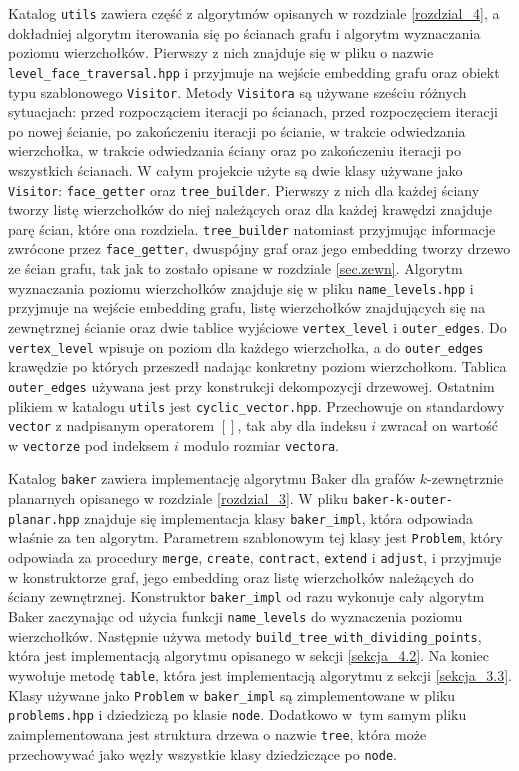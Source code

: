 \documentclass[twoside,a4paper,12pt]{report} %
\theoremstyle{break}
\begin{document}
Katalog \texttt{utils} zawiera część z algorytmów opisanych w rozdziale \ref{rozdzial_4},  a dokładniej algorytm iterowania się po ścianach grafu i algorytm wyznaczania poziomu wierzchołków. Pierwszy z nich znajduje się w pliku o nazwie \texttt{level\_face\_traversal.hpp} i przyjmuje na wejście embedding grafu oraz obiekt typu szablonowego \texttt{Visitor}. Metody \texttt{Visitora} są używane sześciu różnych sytuacjach: przed rozpocząciem iteracji po ścianach, przed rozpoczęciem iteracji po nowej ścianie, po zakończeniu iteracji po ścianie, w trakcie odwiedzania wierzchołka, w trakcie odwiedzania ściany oraz po zakończeniu iteracji po wszystkich ścianach. W całym projekcie użyte są dwie klasy używane jako \texttt{Visitor}: \texttt{face\_getter} oraz \texttt{tree\_builder}. Pierwszy z nich dla każdej ściany tworzy listę wierzchołków do niej należących oraz dla każdej krawędzi znajduje parę ścian, które ona rozdziela. \texttt{tree\_builder} natomiast przyjmując informacje zwrócone przez \texttt{face\_getter}, dwuspójny graf oraz jego embedding tworzy drzewo ze ścian grafu, tak jak to zostało opisane w rozdziale \ref{sec.zewn}. Algorytm wyznaczania poziomu wierzchołków znajduje się w pliku \texttt{name\_levels.hpp} i przyjmuje na wejście embedding grafu, listę wierzchołków znajdujących się na zewnętrznej ścianie oraz dwie tablice wyjściowe \texttt{vertex\_level} i \texttt{outer\_edges}. Do \texttt{vertex\_level} wpisuje on poziom dla każdego wierzchołka, a do \texttt{outer\_edges} krawędzie po których przeszedł nadając konkretny poziom wierzchołkom. Tablica \texttt{outer\_edges} używana jest przy konstrukcji dekompozycji drzewowej. Ostatnim plikiem w katalogu \texttt{utils} jest \texttt{cyclic\_vector.hpp}. Przechowuje on standardowy \texttt{vector} z nadpisanym operatorem $[]$, tak aby dla indeksu $i$ zwracał on wartość w \texttt{vectorze} pod indeksem $i$ modulo rozmiar \texttt{vectora}.

Katalog \texttt{baker} zawiera implementację algorytmu Baker dla grafów $k$-zewnętrznie planarnych opisanego w rozdziale \ref{rozdzial_3}. W pliku \texttt{baker-k-outer-planar.hpp} znajduje się implementacja klasy \texttt{baker\_impl}, która odpowiada właśnie za ten algorytm. Parametrem szablonowym tej klasy jest \texttt{Problem}, który odpowiada za procedury \texttt{merge}, \texttt{create}, \texttt{contract}, \texttt{extend} i \texttt{adjust}, i przyjmuje w konstruktorze graf, jego embedding oraz listę wierzchołków należących do ściany zewnętrznej. Konstruktor \texttt{baker\_impl} od razu wykonuje cały algorytm Baker zaczynając od użycia funkcji \texttt{name\_levels} do wyznaczenia poziomu wierzchołków. Następnie używa metody \texttt{build\_tree\_with\_dividing\_points}, która jest implementacją algorytmu opisanego w sekcji \ref{sekcja_4.2}. Na koniec wywołuje metodę \texttt{table}, która jest implementacją algorytmu z sekcji \ref{sekcja_3.3}. Klasy używane jako \texttt{Problem} w \texttt{baker\_impl} są zimplementowane w pliku \texttt{problems.hpp} i dziedziczą po klasie \texttt{node}. Dodatkowo w~tym samym pliku zaimplementowana jest struktura drzewa o nazwie \texttt{tree}, która może przechowywać jako węzły wszystkie klasy dziedziczące po \texttt{node}.
\end{document}
